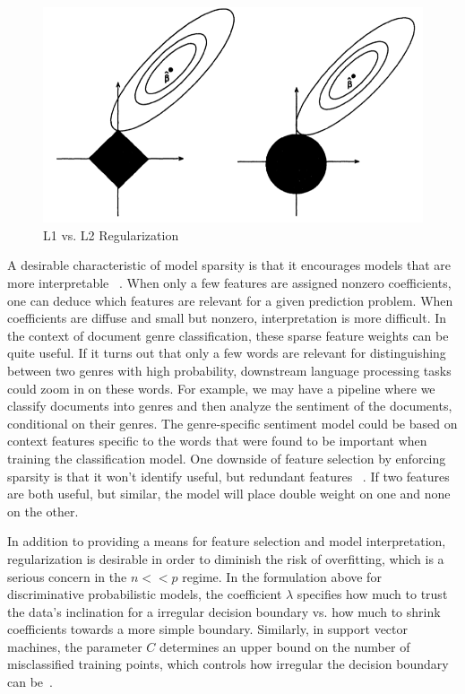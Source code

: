 \documentclass[]{article}
\begin{document}
\begin{center}
\begin{figure}[!ht] 
\centering
\includegraphics[width=.5\textwidth]{../images/sparsity.png}
\caption{L1 vs. L2 Regularization}
\label{fig:sparsity}
\end{figure}
\end{center}

	A desirable characteristic of model sparsity is that it encourages models that are more interpretable  ~\cite{tibshirani1996regression}. When only a few features are assigned nonzero coefficients, one can deduce which features are relevant for a given prediction problem. When coefficients are diffuse and small but nonzero, interpretation is more difficult. In the context of document genre classification, these sparse feature weights can be quite useful. If it turns out that only a few words are relevant for distinguishing between two genres with high probability, downstream language processing tasks could zoom in on these words. For example, we may have a pipeline where we classify documents into genres and then analyze the sentiment of the documents, conditional on their genres. The genre-specific sentiment model could be based on context features specific to the words that were found to be important when training the classification model. One downside of feature selection by enforcing sparsity is that it won't identify useful, but redundant features ~\cite{LectureL1}. If two features are both useful, but similar, the model will place double weight on one and none on the other. 

	In addition to providing a means for feature selection and model interpretation, regularization is desirable in order to diminish the risk of overfitting, which is a serious concern in the $n << p$ regime. In the formulation above for discriminative probabilistic models, the coefficient $\lambda$ specifies how much to trust the data's inclination for a irregular decision boundary vs. how much to shrink coefficients towards a more simple boundary. Similarly, in support vector machines, the parameter $C$ determines an upper bound on the number of misclassified training points, which controls how irregular the decision boundary can be~\cite[332]{Bishop}.
\end{document}
